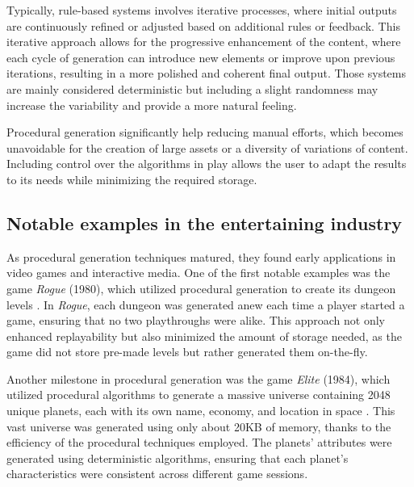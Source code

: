 \cite{Temucin2020}

Typically, rule-based systems involves iterative processes, where initial outputs are continuously refined or adjusted based on additional rules or feedback. This iterative approach allows for the progressive enhancement of the content, where each cycle of generation can introduce new elements or improve upon previous iterations, resulting in a more polished and coherent final output. Those systems are mainly considered deterministic but including a slight randomness may increase the variability and provide a more natural feeling.

Procedural generation significantly help reducing manual efforts, which becomes unavoidable for the creation of large assets or a diversity of variations of content. Including control over the algorithms in play allows the user to adapt the results to its needs while minimizing the required storage. 

\subsection{Notable examples in the entertaining industry}

As procedural generation techniques matured, they found early applications in video games and interactive media. One of the first notable examples was the game \textit{Rogue} (1980), which utilized procedural generation to create its dungeon levels . In \textit{Rogue}, each dungeon was generated anew each time a player started a game, ensuring that no two playthroughs were alike. This approach not only enhanced replayability but also minimized the amount of storage needed, as the game did not store pre-made levels but rather generated them on-the-fly.

Another milestone in procedural generation was the game \textit{Elite} (1984), which utilized procedural algorithms to generate a massive universe containing 2048 unique planets, each with its own name, economy, and location in space . This vast universe was generated using only about 20KB of memory, thanks to the efficiency of the procedural techniques employed. The planets' attributes were generated using deterministic algorithms, ensuring that each planet's characteristics were consistent across different game sessions.

